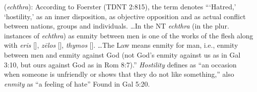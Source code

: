 \item[Hostility,]

(\textit{echthra}):
According to Foerster (TDNT 2:815), the term denotes ```Hatred,' `hostility,' as an inner disposition, as objective opposition and as actual conflict between nations, groups and individuals. \ldots In the NT \emph{echthra} (in the plur. instances of \emph{echthra}) as enmity between men is one of the works of the flesh along with \emph{eris} [], \emph{zēlos} [], \emph{thymos} []. \ldots The Law means enmity for man, i.e., enmity between men and enmity against God (not God's enmity against us as in Gal 3:10, but ours against God as in Rom 8:7).'' \emph{Hostility} defines as ``an occasion when someone is unfriendly or shows that they do not like something,'' also \emph{enmity} as ``a feeling of hate''
Found in Gal 5:20.
